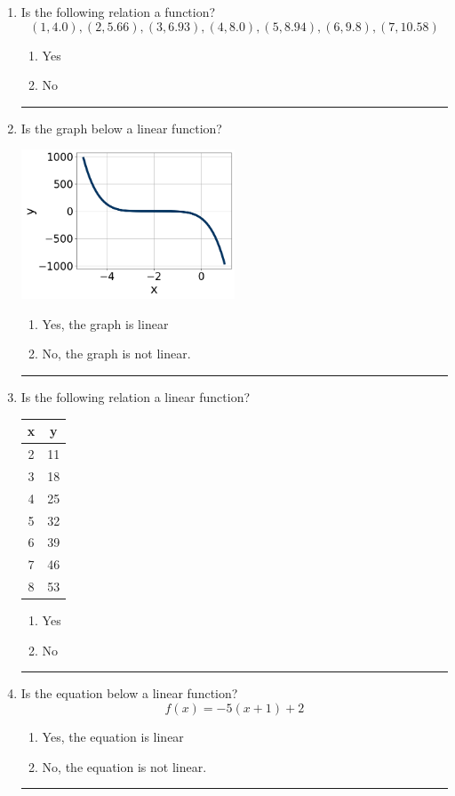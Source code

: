 \documentclass[14pt]{extbook}
\newcommand{\litem}[1]{\item#1\hspace*{-1cm}\rule{\textwidth}{0.4pt}}
\begin{document}
\begin{enumerate}
{\begin{enumerate}[label=\Alph*.]
\end{enumerate} }
\litem{
Is the following relation a function?\[ (1, 4.0), (2, 5.66), (3, 6.93), (4, 8.0), (5, 8.94), (6, 9.8), (7, 10.58) \]\begin{enumerate}[label=\Alph*.]
\item Yes
\item No

\end{enumerate} }
\litem{
Is the graph below a linear function?
\begin{center}
    \includegraphics[width=0.5\textwidth]{../Figures/MA_8_F_1_2_graphC.png}
\end{center}
\begin{enumerate}[label=\Alph*.]
\item Yes, the graph is linear
\item No, the graph is not linear.

\end{enumerate} }
\litem{
Is the following relation a linear function?

\begin{tabular}{c|c}
x &y\tabularnewline \hline
2 &11\tabularnewline \hline
3 &18\tabularnewline \hline
4 &25\tabularnewline \hline
5 &32\tabularnewline \hline
6 &39\tabularnewline \hline
7 &46\tabularnewline \hline
8 &53\end{tabular}\begin{enumerate}[label=\Alph*.]
\item Yes
\item No

\end{enumerate} }
\litem{
Is the equation below a linear function?\[ f(x) = -5(x + 1)+2 \]\begin{enumerate}[label=\Alph*.]
\item Yes, the equation is linear
\item No, the equation is not linear.

\end{enumerate} }
\end{enumerate}
\end{document}
